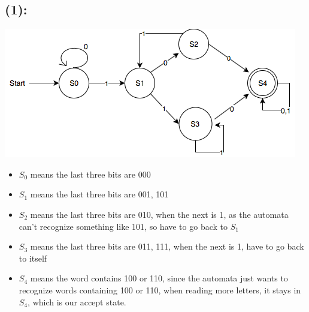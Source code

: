 \documentclass [9 pt]{article}
\theoremstyle{definition}
\begin{document}
\subsection*{(1):}
\includegraphics[scale = 0.8]{Q5.png}
\begin{itemize}
	\item $S_0$ means the last three bits are 000
	\item $S_1$ means the last three bits are 001, 101
	\item $S_2$ means the last three bits are 010, when the next is 1, as the automata can't recognize something like 101, so have to go back to $S_1$
	\item $S_3$ means the last three bits are 011, 111, when the next is 1, have to go back to itself
	\item $S_4$ means the word contains 100 or 110, since the automata just wants to recognize words containing 100 or 110, when reading more letters, it stays in $S_4$, which is our accept state.
\end{itemize}
\end{document}
